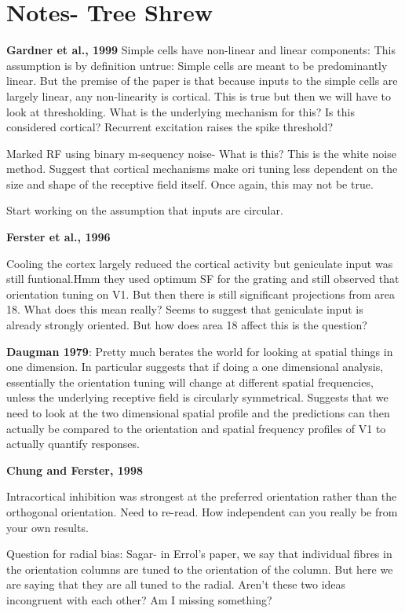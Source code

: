 	\chapter {Notes- Tree Shrew}
	
	\textbf{Gardner et al., 1999}
	Simple cells have non-linear and linear components: This assumption is by definition untrue: Simple cells are meant to be predominantly linear.
	But the premise of the paper is that because inputs to the simple cells are largely linear, any non-linearity is cortical. This is true but then we will have to look at thresholding. What is the underlying mechanism for this? Is this considered cortical? Recurrent excitation raises the spike threshold?
	
	Marked RF using binary m-sequency noise- What is this? This is the white noise method.
	Suggest that cortical mechanisms make ori tuning less dependent on the size and shape of the receptive field itself. Once again, this may not be true.
	
	Start working on the assumption that inputs are circular.
	
	\textbf{Ferster et al., 1996}
	
	Cooling the cortex largely reduced the cortical activity but geniculate input was still funtional.Hmm they used optimum SF for the grating and still observed that orientation tuning on V1. But then there is still significant projections from area 18. What does this mean really? 
	Seems to suggest that geniculate input is already strongly oriented. But how does area 18 affect this is the question?
	
	\textbf{Daugman 1979}: Pretty much berates the world for looking at spatial things in one dimension. In particular suggests that if doing a one dimensional analysis, essentially the orientation tuning will change at different spatial frequencies, unless the underlying receptive field is circularly symmetrical.
	Suggests that we need to look at the two dimensional spatial profile and the predictions can then actually be compared to the orientation and spatial frequency profiles of V1 to actually quantify responses.
	
	\textbf{Chung and Ferster, 1998}
	
	Intracortical inhibition was strongest at the preferred orientation rather than the orthogonal orientation. Need to re-read. How independent can you really be from your own results.
	
	Question for radial bias: Sagar- in Errol's paper, we say that individual fibres in the orientation columns are tuned to the orientation of the column. But here we are saying that they are all tuned to the radial. Aren't these two ideas incongruent with each other? Am I missing something?
	
